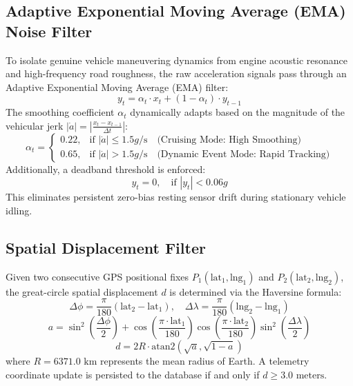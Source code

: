 \subsection{Adaptive Exponential Moving Average (EMA) Noise Filter}
To isolate genuine vehicle maneuvering dynamics from engine acoustic resonance and high-frequency road roughness, the raw acceleration signals pass through an Adaptive Exponential Moving Average (EMA) filter:
\begin{equation}
    y_t = \alpha_t \cdot x_t + (1 - \alpha_t) \cdot y_{t-1}
\end{equation}
The smoothing coefficient $\alpha_t$ dynamically adapts based on the magnitude of the vehicular jerk $|\dot{a}| = \left|\frac{x_t - x_{t-1}}{\Delta t}\right|$:
\begin{equation}
    \alpha_t = 
    \begin{cases}
        0.22, & \text{if } |\dot{a}| \le 1.5g/\text{s} \quad \text{(Cruising Mode: High Smoothing)} \\
        0.65, & \text{if } |\dot{a}| > 1.5g/\text{s} \quad \text{(Dynamic Event Mode: Rapid Tracking)}
    \end{cases}
\end{equation}
Additionally, a deadband threshold is enforced:
\begin{equation}
    y_t = 0, \quad \text{if } |y_t| < 0.06g
\end{equation}
This eliminates persistent zero-bias resting sensor drift during stationary vehicle idling.

\subsection{Spatial Displacement Filter}
Given two consecutive GPS positional fixes $P_1(\text{lat}_1, \text{lng}_1)$ and $P_2(\text{lat}_2, \text{lng}_2)$, the great-circle spatial displacement $d$ is determined via the Haversine formula:
\begin{equation}
    \Delta \phi = \frac{\pi}{180}(\text{lat}_2 - \text{lat}_1), \quad \Delta \lambda = \frac{\pi}{180}(\text{lng}_2 - \text{lng}_1)
\end{equation}
\begin{equation}
    a = \sin^2\left(\frac{\Delta \phi}{2}\right) + \cos\left(\frac{\pi \cdot \text{lat}_1}{180}\right)\cos\left(\frac{\pi \cdot \text{lat}_2}{180}\right)\sin^2\left(\frac{\Delta \lambda}{2}\right)
\end{equation}
\begin{equation}
    d = 2 R \cdot \text{atan2}\left(\sqrt{a}, \sqrt{1 - a}\right)
\end{equation}
where $R = 6371.0\text{ km}$ represents the mean radius of Earth. A telemetry coordinate update is persisted to the database if and only if $d \ge 3.0\text{ meters}$.

